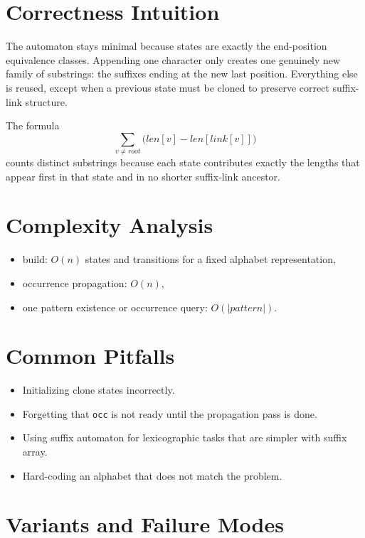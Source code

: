 \section*{Correctness Intuition}

The automaton stays minimal because states are exactly the end-position equivalence classes. Appending one character only
creates one genuinely new family of substrings: the suffixes ending at the new last position. Everything else is reused,
except when a previous state must be cloned to preserve correct suffix-link structure.

The formula
\[
\sum_{v \ne root} \bigl(len[v] - len[link[v]]\bigr)
\]
counts distinct substrings because each state contributes exactly the lengths that appear first in that state and in no
shorter suffix-link ancestor.

\section*{Complexity Analysis}

\begin{itemize}
  \item build: \(O(n)\) states and transitions for a fixed alphabet representation,
  \item occurrence propagation: \(O(n)\),
  \item one pattern existence or occurrence query: \(O(|pattern|)\).
\end{itemize}

\section*{Common Pitfalls}

\begin{itemize}
  \item Initializing clone states incorrectly.
  \item Forgetting that \texttt{occ} is not ready until the propagation pass is done.
  \item Using suffix automaton for lexicographic tasks that are simpler with suffix array.
  \item Hard-coding an alphabet that does not match the problem.
\end{itemize}

\section*{Variants and Failure Modes}

